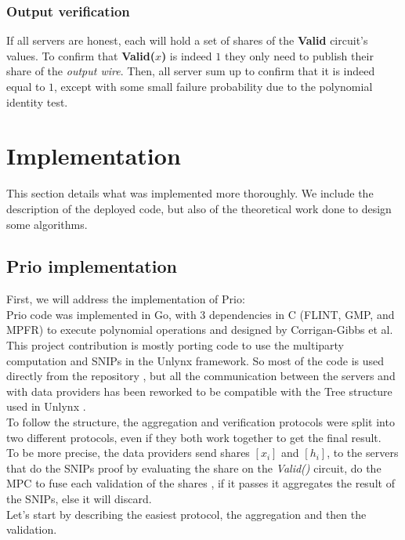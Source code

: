 \documentclass{article}
\begin{document}
\subsubsection{Output verification}
If all servers are honest, each will hold a set of shares of the \textbf{Valid} circuit's values. To confirm that \textbf{Valid($x$)} is indeed $1$ they only need to publish their share of the \textit{output wire}. Then, all server sum up to confirm that it is indeed equal to $1$, except with some small failure probability due to the polynomial identity test.


\section{Implementation}
This section details what was implemented more thoroughly. We include the description of the deployed code, but also of the theoretical work done to design some algorithms.

\subsection{Prio implementation}
First, we will address the implementation of Prio:\\

Prio code \cite{priocode} was implemented in Go, with 3 dependencies in C (FLINT, GMP, and MPFR) to execute polynomial operations and designed by Corrigan-Gibbs et al.\\
This project contribution is mostly porting code to use the multiparty computation and SNIPs in the Unlynx framework. So most of the code is used directly from the repository \cite{prioimple}, but all the communication between the servers and with data providers has been reworked to be compatible with the Tree structure used in Unlynx \cite{unlynxcode}.\\
To follow the structure, the aggregation and verification protocols were split into two different protocols, even if they both work together to get the final result.\\
To be more precise, the data providers send shares $[x_i]$ and $[h_i]$, to the servers that do the SNIPs proof by evaluating the share on the \textit{Valid()} circuit, do the MPC to fuse each validation of the shares , if it passes it aggregates the result of the SNIPs, else it will discard.\\
Let's start by describing the easiest protocol, the aggregation and then the validation.\\
\end{document}
